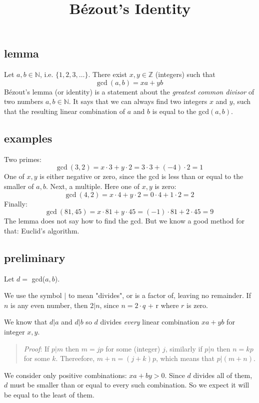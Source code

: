 \documentclass[11pt, oneside]{article}
\title{B\'ezout's Identity}
\date{}
\begin{document}
\maketitle
\Large


\subsection*{lemma}
Let $a,b \in \mathbb{N}$, i.e. $\{ 1, 2, 3, \dots \}$.  There exist $x,y \in \mathbb{Z}$ (integers) such that
\[ \text{gcd} \ (a,b) = xa + yb \]
B\'ezout's lemma (or identity) is a statement about the \emph{greatest common divisor} of two numbers $a,b \in \mathbb{N}$.  It says that we can always find two integers $x$ and $y$, such that the resulting linear combination of $a$ and $b$ is equal to the gcd$(a,b)$.

\subsection*{examples}
Two primes:
\[ \text{gcd} \ (3,2) = x \cdot 3 + y \cdot 2 = 3 \cdot 3 + (-4) \cdot 2 = 1 \]
One of $x,y$ is either negative or zero, since the gcd is less than or equal to the smaller of $a,b$.  Next, a multiple.  Here one of $x,y$ is zero:
\[ \text{gcd} \ (4,2) = x \cdot 4 + y \cdot 2 = 0 \cdot 4 + 1 \cdot 2 = 2 \]
Finally:
\[ \text{gcd} \ (81,45) = x \cdot 81 + y \cdot 45 = (-1) \cdot 81 + 2 \cdot 45 = 9 \]
The lemma does not say how to find the gcd.  But we know a good method for that:  Euclid's algorithm.

\subsection*{preliminary}
Let $d = $ gcd($a,b$).

We use the symbol $|$ to mean "divides", or is a factor of, leaving no remainder.  If $n$ is any even number, then $2|n$, since $n = 2 \cdot q$ + r where $r$ is zero.

We know that $d|a$ and $d|b$ so $d$ divides \emph{every} linear combination $xa + yb$ for integer $x,y$.

\begin{quote}  \emph{Proof}: If $p | m$ then $m = jp$ for some (integer) $j$, similarly if $p | n$ then $n = kp$ for some $k$.  Thereefore, $m + n = (j + k)p$, which means that $p | (m + n)$.\end{quote}

We consider only positive combinations:  $xa + by > 0$.  Since $d$ divides all of them, $d$ must be smaller than or equal to every such combination.  So we expect it will be equal to the least of them.
\end{document}
